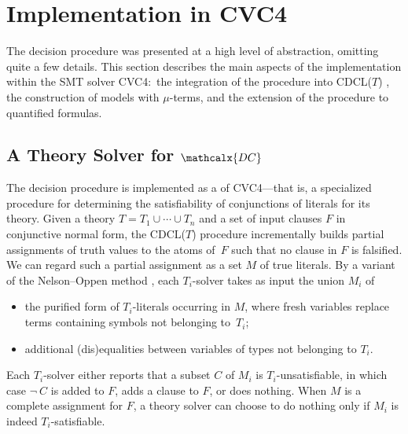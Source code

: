 \documentclass[smallcondensed,draft]{svjour3}
\newcommand{\thD}{\mathcalx{DC}}
\begin{document}
\section{Implementation in CVC4}
\label{sec:implementation-as-a-theory-solver-in-cvc4}

The decision procedure was presented at a high level of abstraction, omitting
quite a few details. This section describes the main aspects of the
implementation within the SMT solver CVC4:\ the integration of the
procedure into CDCL($T$)
\cite{ganzinger-et-al-2004}, the construction of models with $\mu$-terms,
and the extension of the procedure to quantified formulas.

\subsection{A Theory Solver for $\thD$}

The decision procedure is implemented as a  of CVC4---that is, a
specialized procedure for determining the satisfiability of conjunctions of
literals for its theory.
Given a theory $T = T_1 \mathrel\cup \cdots \mathrel\cup T_n$ and a set of
input clauses $F$ in conjunctive normal form, the CDCL($T$) procedure
incrementally builds partial assignments of
truth values to the atoms of~$F$ such that no clause in $F$ is falsified. We can regard such a
partial assignment as a set $M$ of true literals.
By a variant \cite{jovanovic2011sharing}
of the Nelson--Oppen method \cite{nelson-oppen-1979},
each $T_i$-solver %
takes as input the union $M_i$
of
\begin{itemize}
\item the purified form of $T_i$-literals occurring in $M$, where fresh
variables replace terms containing symbols not belonging to~$T_i$;
\item additional (dis)equalities between variables of types not belonging to
$T_i$.
\end{itemize}
Each $T_i$-solver
either reports that a subset $C$ of $M_i$ is $T_i$-unsatisfiable, in which case
$\neg\: C$ is added to $F\!$, adds a clause to $F\!$, or does nothing.
When $M$ is a complete assignment for $F\!$, a theory solver can choose to do
nothing only if $M_i$ is indeed $T_i$-satisfiable.
\end{document}
